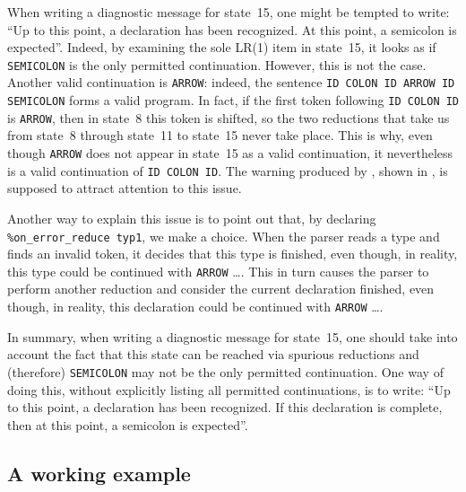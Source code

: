 \documentclass[onecolumn,11pt,nocopyrightspace,preprint]{sigplanconf}
\begin{document}
When writing a diagnostic message for state~15, one might be tempted to write:
``Up to this point, a declaration has been recognized. At this point, a
semicolon is expected''. Indeed, by examining the sole LR(1) item in state~15,
it looks as if \verb+SEMICOLON+ is the only permitted continuation. However,
this is not the case. Another valid continuation is \verb+ARROW+: indeed, the
sentence
\texttt{ID COLON ID ARROW ID SEMICOLON} forms a valid program. In fact, if
the first token following \texttt{ID COLON ID} is \texttt{ARROW}, then in
state~8 this token is shifted, so the two reductions that take us from state~8
through state~11 to state~15 never take place. This is why, even though
\texttt{ARROW} does not appear in state~15 as a valid continuation, it
nevertheless is a valid continuation of \texttt{ID COLON ID}. The warning
produced by \menhir, shown in , is supposed to
attract attention to this issue.

Another way to explain this issue is to point out that, by declaring
\verb+%on_error_reduce typ1+, we make a choice.
When the parser reads a type and finds an invalid token, it decides that this
type is finished, even though, in reality, this type could be continued
with \verb+ARROW+ \ldots. This in turn causes the parser to perform another
reduction and consider the current declaration finished, even though, in
reality, this declaration could be continued with \verb+ARROW+ \ldots.

In summary, when writing a diagnostic message for state~15, one should take
into account the fact that this state can be reached via spurious reductions
and (therefore) \verb+SEMICOLON+ may not be the only permitted continuation.
One way of doing this, without explicitly listing all permitted continuations,
is to write: ``Up to this point, a declaration has been recognized. If this
declaration is complete, then at this point, a semicolon is expected''.


\subsection{A working example}
\label{sec:errors:example}
\end{document}
